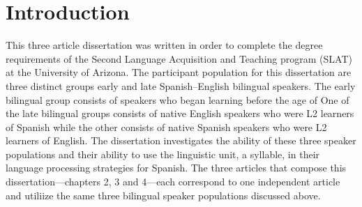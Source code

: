 \documentclass[
12pt, %
english, %
doublespacing, %
nolistspacing, %
liststotoc, %
headsepline, %
chapterinoneline, %
openany, %
]{DoctoralThesis}\usepackage[]{graphicx}\usepackage[]{color}
\begin{document}
\label{Chapter1} %




\section{Introduction}

This three article dissertation was written in order to complete the degree requirements of the Second Language Acquisition and Teaching program (SLAT) at the University of Arizona. The participant population for this dissertation are three distinct groups early and late Spanish–English bilingual speakers. The early bilingual group consists of speakers who began learning before the age of %
One of the late bilingual groups consists of native English speakers who were L2 learners of Spanish while the other consists of native Spanish speakers who were L2 learners of English. The dissertation investigates the ability of these three speaker populations and their ability to use the linguistic unit, a syllable, in their language processing strategies for Spanish. The three articles that compose this dissertation---chapters 2, 3 and 4---each correspond to one independent article and utiliize the same three bilingual speaker populations discussed above.

\end{document}

